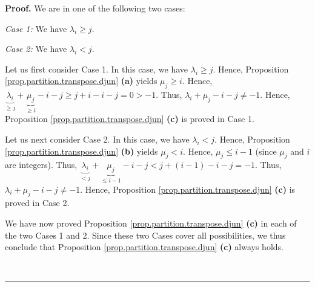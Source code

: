 \documentclass[numbers=enddot,12pt,final,onecolumn,notitlepage]{scrartcl}%
\theoremstyle{definition}
\newenvironment{proof}[1][Proof]{\noindent\textbf{#1.} }{\ \rule{0.5em}{0.5em}}
\newenvironment{verlong}{}{}
\begin{document}
\begin{verlong}
\begin{proof}
We are in one of the following two cases:

\textit{Case 1:} We have $\lambda_{i}\geq j$.

\textit{Case 2:} We have $\lambda_{i}<j$.

Let us first consider Case 1. In this case, we have $\lambda_{i}\geq j$.
Hence, Proposition \ref{prop.partition.transpose.djun} \textbf{(a)} yields
$\mu_{j}\geq i$. Hence, $\underbrace{\lambda_{i}}_{\geq j}+\underbrace{\mu
_{j}}_{\geq i}-i-j\geq j+i-i-j=0>-1$. Thus, $\lambda_{i}+\mu_{j}-i-j\neq-1$.
Hence, Proposition \ref{prop.partition.transpose.djun} \textbf{(c)} is proved
in Case 1.

Let us next consider Case 2. In this case, we have $\lambda_{i}<j$. Hence,
Proposition \ref{prop.partition.transpose.djun} \textbf{(b)} yields $\mu
_{j}<i$. Hence, $\mu_{j}\leq i-1$ (since $\mu_{j}$ and $i$ are integers).
Thus, $\underbrace{\lambda_{i}}_{<j}+\underbrace{\mu_{j}}_{\leq i-1}%
-i-j<j+\left(  i-1\right)  -i-j=-1$. Thus, $\lambda_{i}+\mu_{j}-i-j\neq-1$.
Hence, Proposition \ref{prop.partition.transpose.djun} \textbf{(c)} is proved
in Case 2.

We have now proved Proposition \ref{prop.partition.transpose.djun}
\textbf{(c)} in each of the two Cases 1 and 2. Since these two Cases cover all
possibilities, we thus conclude that Proposition
\ref{prop.partition.transpose.djun} \textbf{(c)} always holds.


\end{proof}
\end{verlong}
\end{document}
